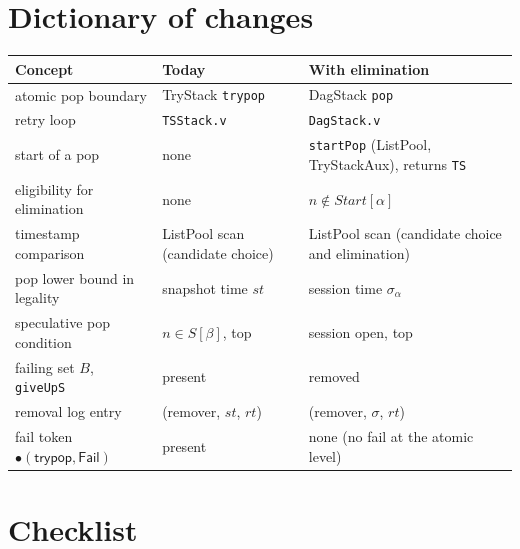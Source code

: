 \documentclass[11pt]{article}
\theoremstyle{definition}
\theoremstyle{remark}
\newcommand{\code}[1]{\texttt{#1}}
\newcommand{\file}[1]{\texttt{#1}}
\newcommand{\Start}{\mathit{Start}}
\newcommand{\sess}{\sigma}
\newcommand{\tok}[1]{\mathsf{#1}}
\begin{document}
\appendix

\section{Dictionary of changes}

\begin{center}
\small
\begin{tabularx}{\textwidth}{@{}>{\raggedright\arraybackslash}p{3.6cm}>{\raggedright\arraybackslash}p{4.2cm}X@{}}
\toprule
Concept & Today & With elimination \\
\midrule
atomic pop boundary & TryStack \code{trypop} & DagStack \code{pop} \\
retry loop & \file{TSStack.v} & \file{DagStack.v} \\
start of a pop & none & \code{startPop} (ListPool, TryStackAux), returns \code{TS} \\
eligibility for elimination & none & $n \notin \Start[\alpha]$ \\
timestamp comparison & ListPool scan (candidate choice) & ListPool scan (candidate choice and elimination) \\
pop lower bound in legality & snapshot time $st$ & session time $\sess_\alpha$ \\
speculative pop condition & $n \in S[\beta]$, top & session open, top \\
failing set $B$, \code{giveUpS} & present & removed \\
removal log entry & (remover, $st$, $rt$) & (remover, $\sess$, $rt$) \\
fail token $\tok{\bullet(trypop,Fail)}$ & present & none (no fail at the atomic level) \\
\bottomrule
\end{tabularx}
\end{center}

\section{Checklist}
\end{document}

